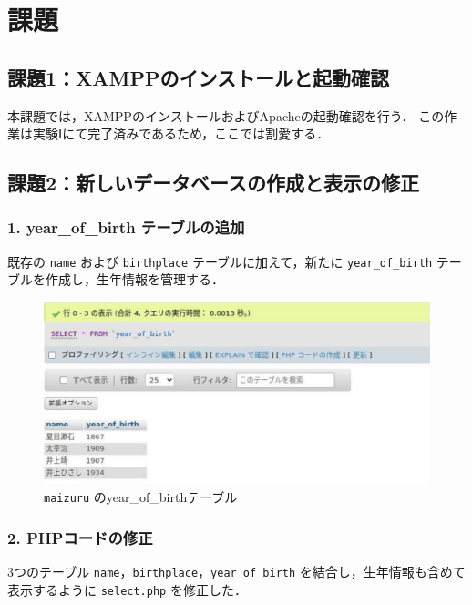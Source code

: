 \section{課題}

\subsection*{課題1：XAMPPのインストールと起動確認}

本課題では，XAMPPのインストールおよびApacheの起動確認を行う．
この作業は実験Ⅰにて完了済みであるため，ここでは割愛する．

\subsection*{課題2：新しいデータベースの作成と表示の修正}

\subsubsection*{1. year\_of\_birth テーブルの追加}

既存の \texttt{name} および \texttt{birthplace} テーブルに加えて，新たに \texttt{year\_of\_birth} テーブルを作成し，生年情報を管理する．

\begin{figure}[htbp]
  \centering
  \includegraphics[width=0.9\linewidth]{figure/5.pdf}
  \caption{\texttt{maizuru} のyear\_of\_birthテーブル}
\end{figure}

\subsubsection*{2. PHPコードの修正}

3つのテーブル \texttt{name}，\texttt{birthplace}，\texttt{year\_of\_birth} を結合し，生年情報も含めて表示するように \texttt{select.php} を修正した．

